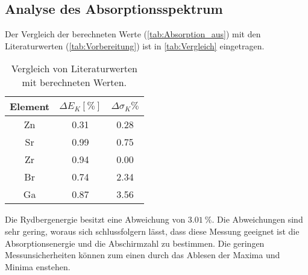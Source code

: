 \subsection{Analyse des Absorptionsspektrum} %
\label{sub:Absorption_durch}
Der Vergleich der berechneten Werte (\ref{tab:Absorption_aus}) mit den Literaturwerten (\ref{tab:Vorbereitung}) ist in \autoref{tab:Vergleich} eingetragen.
\begin{table}[H]
    \centering
    \caption{Vergleich von Literaturwerten mit berechneten Werten.}
    \label{tab:Vergleich}
    \begin{tabular}{c S S }
    \toprule
    {Element} & {$\Delta E_{K} [\si{\percent}]$}& {$\Delta\sigma_K \si{\percent}$}\\
    \midrule
      Zn & 0.31 & 0.28 \\
      Sr & 0.99 & 0.75 \\
      Zr & 0.94 & 0.00 \\
      Br & 0.74 & 2.34 \\
      Ga & 0.87 & 3.56 \\ 
    \bottomrule
    \end{tabular}
  \end{table}
Die Rydbergenergie besitzt eine Abweichung von $\qty{3.01}{\percent}$.
Die Abweichungen sind sehr gering, woraus sich schlussfolgern lässt, dass diese
Messung geeignet ist die Absorptionsenergie und die Abschirmzahl zu bestimmen.
Die geringen Messunsicherheiten können zum einen durch das Ablesen der Maxima und Minima enstehen. 
